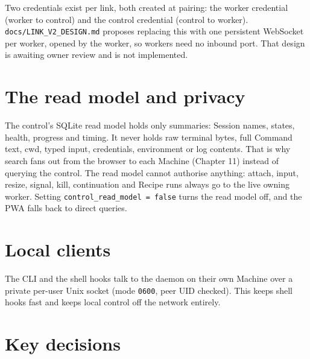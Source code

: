 Two credentials exist per link, both created at pairing: the worker credential (worker to control) and the control credential (control to worker). \texttt{docs/\allowbreak{}LINK\_\allowbreak{}V2\_\allowbreak{}DESIGN.\allowbreak{}md} proposes replacing this with one persistent WebSocket per worker, opened by the worker, so workers need no inbound port. That design is awaiting owner review and is not implemented.

\section{\texorpdfstring{The read model and privacy}{The read model and privacy}}

The control's SQLite read model holds only summaries: Session names, states, health, progress and timing. It never holds raw terminal bytes, full Command text, cwd, typed input, credentials, environment or log contents. That is why search fans out from the browser to each Machine (Chapter 11) instead of querying the control. The read model cannot authorise anything: attach, input, resize, signal, kill, continuation and Recipe runs always go to the live owning worker. Setting \texttt{control\_\allowbreak{}read\_\allowbreak{}model\ =\allowbreak{}\ false} turns the read model off, and the PWA falls back to direct queries.

\section{\texorpdfstring{Local clients}{Local clients}}

The CLI and the shell hooks talk to the daemon on their own Machine over a private per-user Unix socket (mode \texttt{0600}, peer UID checked). This keeps shell hooks fast and keeps local control off the network entirely.

\section{\texorpdfstring{Key decisions}{Key decisions}}

